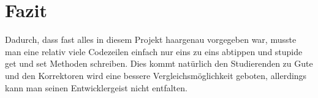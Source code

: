 \chapter{Fazit}
Dadurch, dass fast alles in diesem Projekt haargenau vorgegeben war, musste man eine relativ viele Codezeilen einfach nur eins zu eins abtippen und stupide get und set Methoden schreiben. Dies kommt natürlich den Studierenden zu Gute und den Korrektoren wird eine bessere Vergleichsmöglichkeit geboten, allerdings kann man seinen Entwicklergeist nicht entfalten.